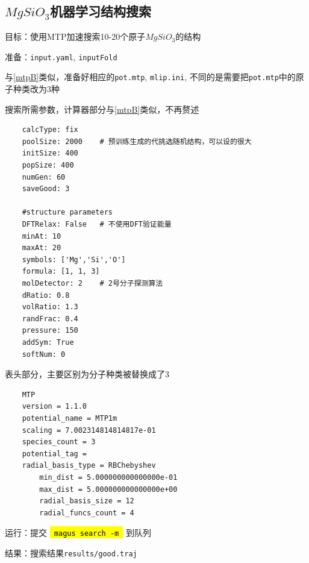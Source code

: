 \documentclass[12pt]{article}
\newcommand{\code}[1]{
  \begingroup
  \sethlcolor{Seashell}
  {\hl{\texttt{~#1~}}}
  \endgroup
}
\newcommand{\file}[1]{\texttt{#1}}
\begin{document}
\subsection{\texorpdfstring{$MgSiO_3$机器学习结构搜索}{MgSiO3机器学习结构搜索}}
目标：使用MTP加速搜索10-20个原子$MgSiO_3$的结构\par
准备：\file{input.yaml}, \file{inputFold}\par
与\ref{mtpB}类似，准备好相应的\file{pot.mtp}, \file{mlip.ini}, 
不同的是需要把\file{pot.mtp}中的原子种类改为3种
\begin{tcolorbox}[enhanced, breakable, title = {\file{input.yaml}}]
    搜索所需参数，计算器部分与\ref{mtpB}类似，不再赘述
    \tcblower
    \begin{verbatim}
    calcType: fix                                                              
    poolSize: 2000    # 预训练生成的代挑选随机结构，可以设的很大
    initSize: 400
    popSize: 400
    numGen: 60
    saveGood: 3

    #structure parameters
    DFTRelax: False   # 不使用DFT验证能量
    minAt: 10
    maxAt: 20
    symbols: ['Mg','Si','O']
    formula: [1, 1, 3]
    molDetector: 2    # 2号分子探测算法
    dRatio: 0.8 
    volRatio: 1.3 
    randFrac: 0.4 
    pressure: 150 
    addSym: True
    softNum: 0
    \end{verbatim}
\end{tcolorbox}
%
\begin{tcolorbox}[enhanced, breakable, title=\file{MTP/pot.mtp}]
    表头部分，主要区别为分子种类被替换成了3
    \tcblower
\begin{verbatim} 
    MTP                                                                        
    version = 1.1.0
    potential_name = MTP1m
    scaling = 7.002314814814817e-01
    species_count = 3 
    potential_tag = 
    radial_basis_type = RBChebyshev
        min_dist = 5.000000000000000e-01
        max_dist = 5.000000000000000e+00
        radial_basis_size = 12
        radial_funcs_count = 4
\end{verbatim}
\end{tcolorbox}
运行：提交\code{magus search -m}到队列\par
结果：搜索结果\file{results/good.traj}
\end{document}
